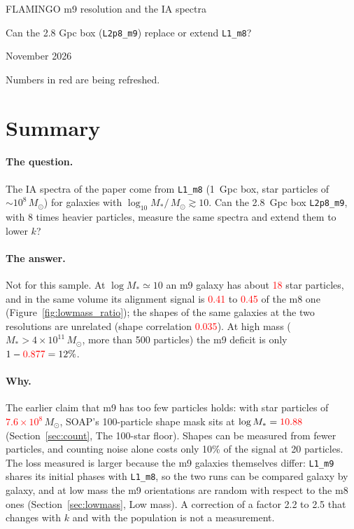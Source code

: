 \documentclass[11pt]{article}
\newcommand{\Msun}{\,M_\odot}
\newcommand{\Mstar}{M_\ast}
\newcommand{\run}[1]{\texttt{#1}}
\newif\ifnumbersfinal
\newcommand{\refresh}[1]{\ifnumbersfinal#1\else\textcolor{red}{#1}\fi}
\newcommand{\mStarMnine}{\refresh{\ensuremath{7.6\times10^{8}}}}
\newcommand{\logMhundredMnine}{\refresh{10.88}}
\newcommand{\NstarTenMnine}{\refresh{18}}
\newcommand{\ratioHM}{\refresh{0.877}}
\newcommand{\ratioLM}{\refresh{0.45}}
\newcommand{\ratioLMmatch}{\refresh{0.41}}
\newcommand{\corrLM}{\refresh{0.035}}
\begin{document}
\begin{center}
  {\LARGE FLAMINGO m9 resolution and the IA spectra\par}
  \vspace{0.6em}
  {\large Can the 2.8 Gpc box (\run{L2p8\_m9}) replace or extend \run{L1\_m8}?\par}
  \vspace{0.6em}
  {\large November 2026\par}
  \ifnumbersfinal\else
    \vspace{0.6em}
    {\color{red}Numbers in red are being refreshed.\par}
  \fi
\end{center}
\vspace{1em}

\section{Summary}
\label{sec:summary}

\paragraph{The question.}
The IA spectra of the paper come from \run{L1\_m8} (1~Gpc box, star particles of
$\sim\!10^{8}\Msun$) for galaxies with $\log_{10}\Mstar/\Msun \gtrsim 10$. Can the
2.8~Gpc box \run{L2p8\_m9}, with 8 times heavier particles, measure the same
spectra and extend them to lower $k$?

\paragraph{The answer.}
Not for this sample. At $\log\Mstar \simeq 10$ an m9 galaxy has about
\NstarTenMnine{} star particles, and in the same volume its alignment signal is
\ratioLMmatch{} to \ratioLM{} of the m8 one (Figure~\ref{fig:lowmass_ratio});
the shapes of the same galaxies at the two resolutions are unrelated (shape
correlation \corrLM). At high mass ($\Mstar > 4\times10^{11}\Msun$, more than 500
particles) the m9 deficit is only $1-\ratioHM = 12\%$.

\paragraph{Why.}
The earlier claim that m9 has too few particles holds: with star particles of
\mStarMnine$\Msun$, SOAP's 100-particle shape mask sits at
$\log\Mstar = \logMhundredMnine$ (Section~\ref{sec:count}, The 100-star floor).
Shapes can be measured from fewer particles, and counting noise alone costs only
10\% of the signal at 20 particles. The loss measured is larger because the m9
galaxies themselves differ: \run{L1\_m9} shares its initial phases with
\run{L1\_m8}, so the two runs can be compared galaxy by galaxy, and at low mass
the m9 orientations are random with respect to the m8 ones
(Section~\ref{sec:lowmass}, Low mass). A correction of a factor 2.2 to 2.5 that
changes with $k$ and with the population is not a measurement.
\end{document}
